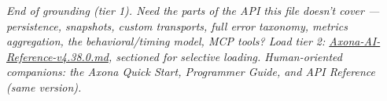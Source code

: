 \documentclass[
  nobib]{tufte-handout}
\begin{document}
\emph{End of grounding (tier 1). Need the parts of the API this file
doesn't cover --- persistence, snapshots, custom transports, full error
taxonomy, metrics aggregation, the behavioral/timing model, MCP tools?
Load tier 2: \url{Axona-AI-Reference-v4.38.0.md}, sectioned for
selective loading. Human-oriented companions: the Axona Quick Start,
Programmer Guide, and API Reference (same version).}
\end{document}
